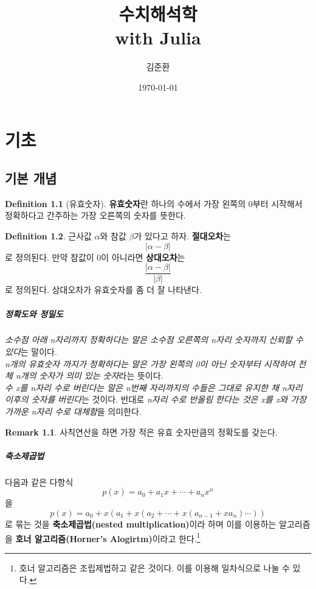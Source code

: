 \documentclass[a4paper, 11pt]{report}
\title{수치해석학 \\with Julia}
\author{김준환}
\date{\today}
\renewcommand{\baselinestretch}{1.3}
\theoremstyle{definition}
\newtheorem*{defn}{Definition}
\newtheorem*{rmk}{Remark}
\begin{document}
\maketitle
\tableofcontents

\renewcommand{\baselinestretch}{1.6}

\chapter{기초}
\section{기본 개념}
\begin{defn}[유효숫자]
\textbf{유효숫자}란 하나의 수에서 가장 왼쪽의 0부터 시작해서 정확하다고 간주하는 가장 오른쪽의 숫자를 뜻한다.
\end{defn}

\begin{defn}
근사값  $\alpha$와 참값 $\beta$가 있다고 하자. \textbf{절대오차}는
\[
|\alpha - \beta|
\]
로 정의된다. 만약 참값이 0이 아니라면 \textbf{상대오차}는
\[
\frac{|\alpha-\beta|}{|\beta|}
\]
로 정의된다. 상대오차가 유효숫자를 좀 더 잘 나타낸다.
\end{defn}

\paragraph{정확도와 정밀도} 
\emph{소수점 아래 n자리까지 정확하다는 말은 소수점 오른쪽의 n자리 숫자까지 신뢰할 수 있다}는 말이다. \\
\emph{n개의 유효숫자 까지가 정확하다는 말은 가장 왼쪽의 0이 아닌 숫자부터 시작하여 전체 n개의 숫자가 의미 있는 숫자}라는 뜻이다. \\
\emph{수 x를 n자리 수로 버린다는 말은 n번째 자리까지의 수들은 그대로 유지한 채 n자리 이후의 숫자를 버린다}는 것이다. 
반대로 \emph{n자리 수로 반올림 한다는 것은 x를 x와 가장 가까운 n자리 수로 대체함}을 의미한다.
\begin{rmk}
    사칙연산을 하면 가장 적은 유효 숫자만큼의 정확도를 갖는다.
\end{rmk}

\paragraph{축소제곱법}
다음과 같은 다항식
\begin{equation}
p(x) = a_0 + a_1x+\cdots +a_nx^n
\end{equation}
을 
\begin{equation}
p(x) = a_0 + x(a_1+x(a_2 + \cdots + x(a_{n-1} +xa_n) \cdots ))
\end{equation}
로 묶는 것을 \textbf{축소제곱법(nested multiplication)}이라 하며 이를 이용하는 알고리즘을 \textbf{호너 알고리즘(Horner's Alogirtm)}이라고 한다.\footnote{호너 알고리즘은 조립제법하고 같은 것이다. 이를 이용해 일차식으로 나눌 수 있다.}
\end{document}
